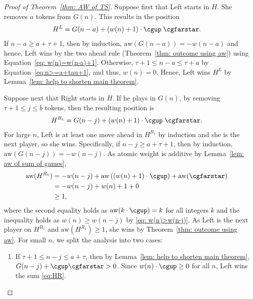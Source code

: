 \documentclass[oneside,reqno]{amsart}
\newcommand{\aw}{\mathrm{aw}}
\begin{document}
\begin{proof}[Proof of Theorem~\ref{thm: AW of TS}]
     Suppose first that Left starts in $H$. She removes $a$ tokens from $G(n)$. This results in the position $$H^L=G(n-a)+(w(n)+1)\cdot\cgup\;\cgfarstar.$$ If $n-a\ge a+\tau+1$, then by induction, $\aw(G(n-a))=-w(n-a)$ and hence, Left wins by the two ahead rule (Theorem~\ref{thm: outcome using aw}) using Equation~\eqref{eq: w(n)=w(n-a)+1}. 
    Otherwise, $\tau+1\le n-a\le \tau+a$ by Equation~\eqref{eq:n>=a+tau+1}, and thus, $w(n)=0$. Hence, Left wins $H^L$ by Lemma~\ref{lem: help to shorten main theorem}.
    
    Suppose next that Right starts in $H$. If he plays in $G(n)$, by removing $\tau+1\le j\le b$ tokens, then the resulting position is 
    \begin{align}\label{eq:HR}
        H^{R_1}=G(n-j)+(w(n)+1)\cdot\cgup\;\cgfarstar.
    \end{align} For large $n$, Left is at least one move ahead in $H^{R_1}$ by induction and she is the next player, so she wins. Specifically,
    if $n-j\ge a+\tau+1$, then by induction, $\aw(G(n-j))=-w(n-j)$. As atomic weight is additive by Lemma~\ref{lem: aw of sum of games}, \begin{align*}
        \aw(H^{R_1})&=-w(n-j)+\aw\left((w(n)+1)\cdot\cgup\right)+\aw(\cgfarstar)\\
        &=-w(n-j)+w(n)+1+0\\
        &\ge 1,
    \end{align*} where the second equality holds as $\aw(k\cdot\cgup)=k$ for all integers $k$ and the inequality holds as $w(n)\ge w(n-j)$ by \eqref{eq: w(n)>w(n-j)}. As Left is the next player on $H^{R_1}$ and $\aw(H^{R_1})\ge 1$, she wins by Theorem~\ref{thm: outcome using aw}.
    For small $n$, we split the analysis into two cases:
    \begin{enumerate}
        \item If $\tau+1\le n-j\le a+\tau$, then by Lemma~\ref{lem: help to shorten main theorem}, $G(n-j)+\cgup\cgfarstar>0$. Since $w(n)\cdot \cgup\ge 0$ for all $n$, Left wins the sum \eqref{eq:HR}.

\end{enumerate}
\end{proof}
\end{document}
